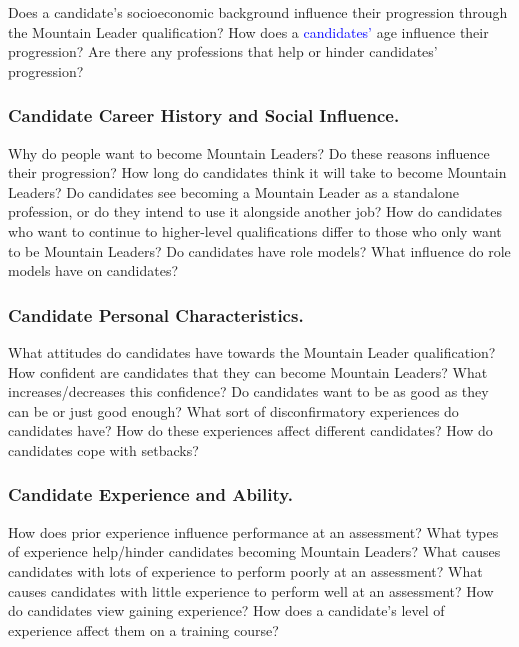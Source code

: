 \documentclass[
  12pt,
  a4paper,
]{book}
\begin{document}
Does a candidate's socioeconomic background influence their progression through the Mountain Leader qualification? How does a \textcolor{blue}{candidates'} age influence their progression? Are there any professions that help or hinder candidates' progression?

\hypertarget{qual-research-questions-career}{%
\subsubsection{Candidate Career History and Social Influence.}\label{qual-research-questions-career}}

Why do people want to become Mountain Leaders? Do these reasons influence their progression? How long do candidates think it will take to become Mountain Leaders? Do candidates see becoming a Mountain Leader as a standalone profession, or do they intend to use it alongside another job? How do candidates who want to continue to higher-level qualifications differ to those who only want to be Mountain Leaders? Do candidates have role models? What influence do role models have on candidates?

\hypertarget{qual-research-questions-personality}{%
\subsubsection{Candidate Personal Characteristics.}\label{qual-research-questions-personality}}

What attitudes do candidates have towards the Mountain Leader qualification? How confident are candidates that they can become Mountain Leaders? What increases/decreases this confidence? Do candidates want to be as good as they can be or just good enough? What sort of disconfirmatory experiences do candidates have? How do these experiences affect different candidates? How do candidates cope with setbacks?

\hypertarget{qual-research-questions-experience}{%
\subsubsection{Candidate Experience and Ability.}\label{qual-research-questions-experience}}

How does prior experience influence performance at an assessment? What types of experience help/hinder candidates becoming Mountain Leaders? What causes candidates with lots of experience to perform poorly at an assessment? What causes candidates with little experience to perform well at an assessment? How do candidates view gaining experience? How does a candidate's level of experience affect them on a training course?
\end{document}
